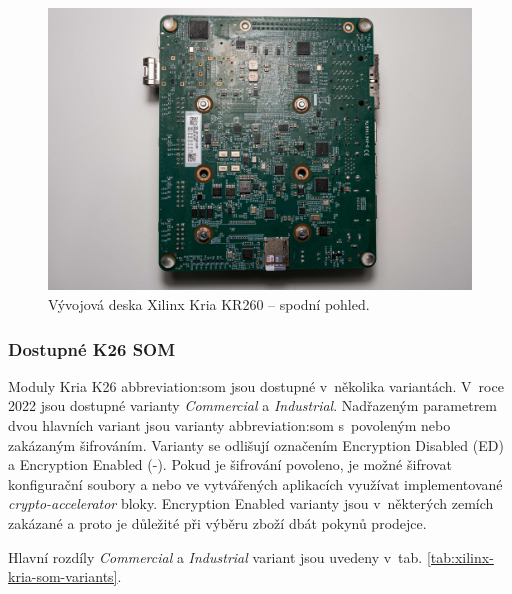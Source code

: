 \documentclass[a4paper, twoside, 11pt]{article}
\begin{document}
				\begin{figure}[H]
					\centering
						\includegraphics[width=1\textwidth]{src/jpg/xilinx-kria-foto-3.jpeg} 
						\caption{Vývojová deska Xilinx Kria KR260 – spodní pohled.}
						\label{fig:xilinx-kria-foto-3}
				\end{figure}
			
			
				\subsubsection{Dostupné K26 SOM}
					Moduly Kria K26 \gls{abbreviation:som} jsou dostupné v~několika variantách. V~roce 2022 jsou dostupné varianty \textit{Commercial} a \textit{Industrial}. Nadřazeným parametrem dvou hlavních variant jsou varianty \gls{abbreviation:som} s~povoleným nebo zakázaným šifrováním. Varianty se odlišují označením Encryption Disabled (ED) a Encryption Enabled (-). Pokud je šifrování povoleno, je možné šifrovat konfigurační soubory a nebo ve vytvářených aplikacích využívat implementované \textit{crypto-accelerator} bloky. Encryption Enabled varianty jsou v~některých zemích zakázané a proto je důležité při výběru zboží dbát pokynů prodejce.
					\par Hlavní rozdíly \textit{Commercial} a \textit{Industrial} variant jsou uvedeny v~tab. \ref{tab:xilinx-kria-som-variants}.
\end{document}
